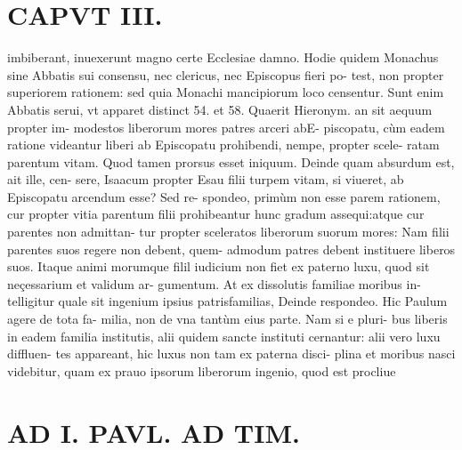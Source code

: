 \documentclass{article}
\begin{document}
\begin{pages}
\section*{CAPVT  III. }
\marginpar{[ p.13 ]}\pstart imbiberant, inuexerunt magno certe Ecclesiae damno. Hodie quidem Monachus sine Abbatis sui consensu, nec clericus, nec Episcopus fieri po- test, non propter superiorem rationem: sed quia Monachi mancipiorum loco censentur. Sunt enim Abbatis serui, vt apparet distinct 54. et 58.  \pend\pstart Quaerit Hieronym. an sit aequum propter im- modestos liberorum mores patres arceri abE- piscopatu, cùm eadem ratione videantur liberi ab Episcopatu prohibendi, nempe, propter scele- ratam parentum vitam. Quod tamen prorsus esset iniquum. Deinde quam absurdum est, ait ille, cen- sere, Isaacum propter Esau filii turpem vitam, si viueret, ab Episcopatu arcendum esse? Sed re- spondeo, primùm non esse parem rationem, cur propter vitia parentum filii prohibeantur hunc gradum assequi:atque cur parentes non admittan- tur propter sceleratos liberorum suorum mores: Nam filii parentes suos regere non debent, quem- admodum patres debent instituere liberos suos. Itaque animi morumque filil iudicium non fiet ex paterno luxu, quod sit neçessarium et validum ar- gumentum. At ex dissolutis familiae moribus in- telligitur quale sit ingenium ipsius patrisfamilias, Deinde respondeo. Hic Paulum agere de tota fa- milia, non de vna tantùm eius parte. Nam si e pluri- bus liberis in eadem familia institutis, alii quidem sancte instituti cernantur: alii vero luxu diffluen- tes appareant, hic luxus non tam ex paterna disci- plina et moribus nasci videbitur, quam ex prauo ipsorum liberorum ingenio, quod est procliue  \pend
\section*{AD I. PAVL. AD TIM. }
\marginpar{[ p.144 ]}
{}

\end{pages}
\end{document}
